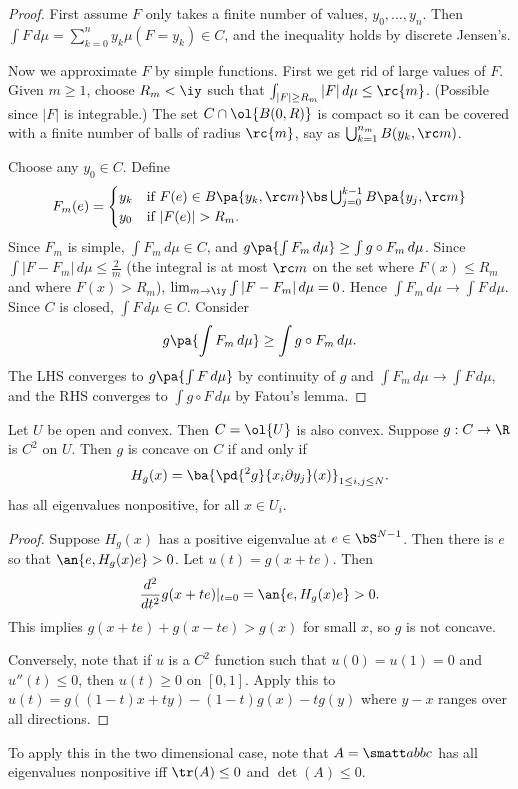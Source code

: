 \begin{proof}
First assume $F$ only takes a finite number of values, $y_0,\ldots, y_n$. Then $\int F\,d\mu=\sum_{k=0}^n y_k \mu(F=y_k)\in C$, and the inequality holds by discrete Jensen's.

Now we approximate $F$ by simple functions. First we get rid of large values of $F$. Given $m\ge 1$, choose $R_m<\iy$ such that $\int_{|F|\ge R_m}|F|\,d\mu\le \rc{m}$. (Possible since $|F|$ is integrable.) The set $C\cap \ol{B(0,R)}$ is compact so it can be covered with a finite number of balls of radius $\rc{m}$, say as $\bigcup_{k=1}^{n_m} B(y_k,\rc m)$. 

Choose any $y_0\in C$. Define
\[
F_m(e)=\begin{cases}
y_k&\text{if }F(e)\in B\pa{y_k,\rc m}\bs \bigcup_{j=0}^{k-1} B\pa{y_j,\rc m}\\
y_0&\text{if } |F(e)|>R_m.
\end{cases}
\]
Since $F_m$ is simple, $\int F_m\,d\mu\in C$, and $g\pa{\int F_m\,d\mu}\ge \int g\circ F_m\,d\mu$. Since $\int |F-F_m|\,d\mu\le \frac{2}{m}$ (the integral is at most $\rc m$ on the set where $F(x)\le R_m$ and where $F(x)>R_m$), $\lim_{m\to \iy} \int |F-F_m|\,d\mu=0$. Hence $\int F_m\,d\mu \to \int F\,d\mu$. Since $C$ is closed, $\int F\,d\mu\in C$. Consider
\[
g\pa{\int F_m\,d\mu}\ge \int g\circ F_m\,d\mu.
\]
The LHS converges to $g\pa{\int F\,d\mu}$ by continuity of $g$ and $\int F_m\,d\mu\to \int F\,d\mu$, and the RHS converges to $\int g\circ F\,d\mu$ by Fatou's lemma.
\end{proof}
\begin{thm}
Let $U$ be open and convex. Then $C=\ol{U}$ is also convex. Suppose $g:C\to \R$ is $C^2$ on $U$. Then $g$ is concave on $C$ if and only if 
\[
H_g(x)=\ba{
\pd{^2g}{x_i\partial y_j}(x)
}_{1\le i,j\le N}.
\]
has all eigenvalues nonpositive, for all $x\in U_i$. 
\end{thm}
\begin{proof}
Suppose $H_g(x)$ has a positive eigenvalue at $e\in \bS^{N-1}$. Then there is $e$ so that $\an{e,H_g(x)e}>0$. Let $u(t)=g(x+te)$. Then
\[
\frac{d^2}{dt^2} g(x+te)|_{t=0}=\an{e,H_g(x)e}>0.
\]
This implies $g(x+te)+g(x-te)>g(x)$ for small $x$, so $g$ is not concave.

Conversely, note that if $u$ is a $C^2$ function such that $u(0)=u(1)=0$ and $u''(t)\le 0$, then $u(t)\ge 0$ on $[0,1]$. Apply this to $u(t)=g((1-t)x+ty)-(1-t)g(x)-tg(y)$ where $y-x$ ranges over all directions.
\end{proof}
To apply this in the two dimensional case, note that $A=\smatt abbc$ has all eigenvalues nonpositive iff $\tr(A)\le 0$ and $\det(A)\le 0$.

